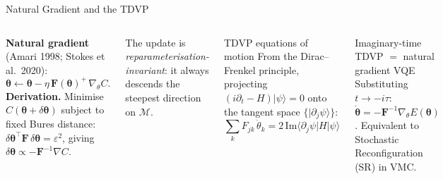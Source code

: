 \documentclass[aspectratio=169,11pt]{beamer}
\newcommand{\btheta}{\boldsymbol{\theta}}
\newcommand{\QFI}{\mathbf{F}}
\newcommand{\manifold}{\mathcal{M}}
\begin{document}
\begin{frame}{Natural Gradient and the TDVP}
  \begin{columns}[T]
    \textbf{Natural gradient} (Amari 1998; Stokes et al.\ 2020):
    \[
      \btheta \leftarrow \btheta
        - \eta\,\QFI(\btheta)^{+}\,\nabla_\theta C.
    \]
    \textbf{Derivation.}  Minimise $C(\btheta+\delta\btheta)$
    subject to fixed Bures distance:
    $\delta\btheta^\top\QFI\,\delta\btheta = \varepsilon^2$,
    giving $\delta\btheta\propto-\QFI^{-1}\nabla C$.

    The update is \emph{reparameterisation-invariant}: it always
    descends the steepest direction on $\manifold$.

    \begin{block}{TDVP equations of motion}
      From the Dirac--Frenkel principle, projecting
      $(i\partial_t - H)|\psi\rangle = 0$
      onto the tangent space $\{|\partial_j\psi\rangle\}$:
      \[
        \sum_k F_{jk}\,\dot{\theta}_k
        = 2\,\mathrm{Im}\langle\partial_j\psi|H|\psi\rangle
      \]
    \end{block}
    \vspace{0.15cm}
    \begin{alertblock}{Imaginary-time TDVP $=$ natural gradient VQE}
      Substituting $t\to-i\tau$:
      $\dot{\btheta} = -\QFI^{-1}\nabla_\theta E(\btheta)$.
      Equivalent to Stochastic Reconfiguration (SR) in VMC.
    \end{alertblock}
  \end{columns}
\end{frame}
\end{document}
